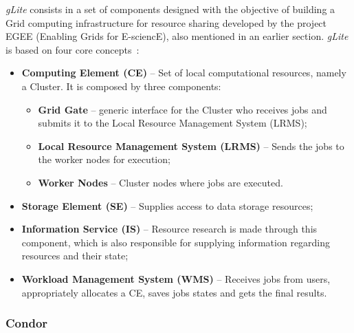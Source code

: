 \textit{gLite} consists in a set of components designed with the objective of building a Grid computing infrastructure for resource sharing developed by the project EGEE (Enabling Grids for E-sciencE), also mentioned in an earlier section.
\textit{gLite} is based on four core concepts~\cite{jorge-ruao,glite}:
\begin{itemize}
\item \textbf{Computing Element (CE)} -- Set of local computational resources, namely a Cluster. It is composed by three components:
	\begin{itemize}
	\item \textbf{Grid Gate} -- generic interface for the Cluster who receives jobs and submits it to the Local Resource Management System (LRMS);
	\item \textbf{Local Resource Management System (LRMS)} -- Sends the jobs to the worker nodes for execution;
	\item \textbf{Worker Nodes} -- Cluster nodes where jobs are executed.
	\end{itemize}
\item \textbf{Storage Element (SE)} -- Supplies access to data storage resources;
\item \textbf{Information Service (IS)} -- Resource research is made through this component, which is also responsible for supplying information regarding resources and their state;
\item \textbf{Workload Management System (WMS)} -- Receives jobs from users, appropriately allocates a CE, saves jobs states and gets the final results.
\end{itemize}

\subsubsection{Condor}\label{condor}

